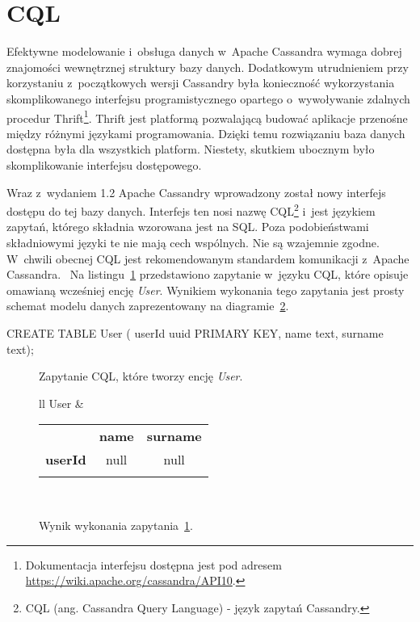 \section{CQL}
\label{sec:about_cql}

Efektywne modelowanie i~obsługa danych w~Apache Cassandra wymaga dobrej znajomości wewnętrznej struktury bazy danych. Dodatkowym utrudnieniem przy korzystaniu z~początkowych wersji Cassandry była konieczność wykorzystania skomplikowanego interfejsu programistycznego opartego o~wywoływanie zdalnych procedur Thrift\footnote{Dokumentacja interfejsu dostępna jest pod adresem \url{https://wiki.apache.org/cassandra/API10}.}. Thrift jest platformą pozwalającą budować aplikacje przenośne między różnymi językami programowania. Dzięki temu rozwiązaniu baza danych dostępna była dla wszystkich platform. Niestety, skutkiem ubocznym było skomplikowanie interfejsu dostępowego.

Wraz z~wydaniem 1.2 Apache Cassandry wprowadzony został nowy interfejs dostępu do tej bazy danych. Interfejs ten nosi nazwę CQL\footnote{CQL (ang. Cassandra Query Language) - język zapytań Cassandry.} i~jest językiem zapytań, którego składnia wzorowana jest na SQL. Poza podobieństwami składniowymi języki te nie mają cech wspólnych. Nie są wzajemnie zgodne. W~chwili obecnej CQL jest rekomendowanym standardem komunikacji z~Apache Cassandra.~\cite{cql_preferred_over_thrift} Na listingu~\ref{lst:cql_example} przedstawiono zapytanie w~języku CQL, które opisuje omawianą wcześniej encję \emph{User}. Wynikiem wykonania tego zapytania jest prosty schemat modelu danych zaprezentowany na diagramie~\ref{tab:cql_example_query_result}.

\begin{verbbox}
	CREATE TABLE User (
	    userId uuid PRIMARY KEY,
	    name text,
	    surname text);
\end{verbbox}

\begin{figure}[ht!]
	\centering
	\theverbbox

	\caption{Zapytanie CQL, które tworzy encję \emph{User}.}
	\label{lst:cql_example}
\end{figure}

\begin{figure}[ht!]
	\centering

	\begin{tabular}{ll}
		User &
		\begin{tabular}{|l||c|c|}
			\hhline{|-||--|}
			 & \textbf{name} & \textbf{surname} \\
			\hhline{|~||==|}
			\textbf{userId} & null & null \\
			\hhline{|-||--|}
		\end{tabular} \\
	\end{tabular}

	\caption{Wynik wykonania zapytania~\ref{lst:cql_example}.}
	\label{tab:cql_example_query_result}
\end{figure}

